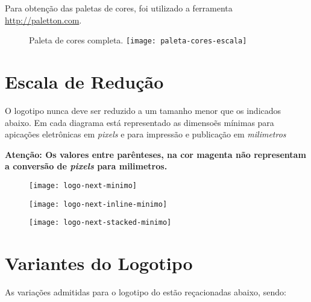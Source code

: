 \documentclass{manualmarca}
\begin{document}
\noindent
Para obtenção das paletas de cores, foi utilizado a ferramenta \href{http://paletton.com}{http://paletton.com}.

\vspace*{1cm}
\begin{figure}[!htp]
  \centering
  {Paleta de cores completa.}
  \texttt{[image: paleta-cores-escala]}
\end{figure}


\pagebreak[4]

\section{Escala de Redução}
\label{sec:escala-de-reducao}

O logotipo nunca deve ser reduzido a um tamanho menor que os indicados abaixo. Em cada diagrama está representado as dimensoẽs mínimas para apicações eletrônicas em \emph{pixels} e para impressão e publicação em \emph{milimetros}

\noindent
{\bfseries Atenção: Os valores entre parênteses, na cor {\color{magenta} magenta} não representam a conversão de \emph{pixels} para milimetros.}


\begin{figure}[!htp]
  \centering
  \texttt{[image: logo-next-minimo]}
\end{figure}
\begin{figure}[!htp]
  \centering
  \texttt{[image: logo-next-inline-minimo]}
\end{figure}
\begin{figure}[!htp]
  \centering
  \texttt{[image: logo-next-stacked-minimo]}
\end{figure}


\pagebreak[4]

\section{Variantes do Logotipo}
\label{sec:vari-do-logot}

As variações admitidas para o logotipo do \NExT{} estão reçacionadas abaixo, sendo:
\end{document}
